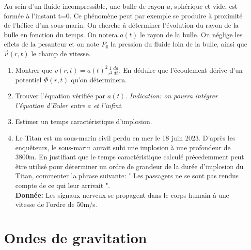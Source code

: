 \documentclass{article}
\begin{document}
Au sein d'un fluide incompressible, une bulle de rayon $a$, sphérique et vide, est formée à l'instant t=0. 
Ce phénomène peut par exemple se produire à proximité de l'hélice d'un sous-marin. 
On cherche à déterminer l'évolution du rayon de la bulle en fonction du temps.
On notera $a(t)$ le rayon de la bulle. 
On néglige les effets de la pesanteur et on note $P_0$ la pression du fluide loin de la bulle, ainsi que $\vec{v}(r,t)$ le champ de vitesse. 
\begin{enumerate}
    \item Montrer que $v(r,t)=a(t)^2 \frac{1}{r^2} \frac{da}{dt}$. 
    En déduire que l'écoulement dérive d'un potentiel $\Phi(r,t)$ qu'on déterminera. 
    \item Trouver l'équation vérifiée par $a(t)$. 
    \textit{ Indication: on pourra intégrer l'équation d'Euler entre $a$ et l'infini. }
    \item Estimer un temps caractéristique d'implosion. 
    \item Le Titan est un sous-marin civil perdu en mer le 18 juin 2023.
    D'après les enquêteurs, le sous-marin aurait subi une implosion à une profondeur de 3800m. 
    En justifiant que le temps caractéristique calculé précedemment peut être utilisé pour déterminer un ordre de grandeur de la durée d'implosion du Titan, commenter la phrase suivante: 
    " Les passagers ne se sont pas rendus compte de ce qui leur arrivait ". 
    \\[0.1cm]
    \textbf{Donnée: } Les signaux nerveux se propagent dans le corps humain à une vitesse de l'ordre de 50m/s.
\end{enumerate}


\section{Ondes de gravitation}
\end{document}
